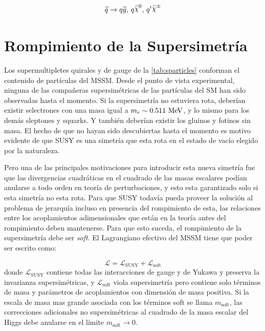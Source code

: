 \begin{equation}
  \susy{q} \to q\gluino, \, q\nino, \, q^\prime \chinopm
\end{equation}



\section{Rompimiento de la Supersimetría}

Los supermultipletes quirales y de gauge de la \cref{tab:sparticles} conforman
el contenido de partículas del MSSM. Desde el punto de vista experimental,
ninguna de las compa\~neras supersimétricas de las partículas del SM han sido
observadas hasta el momento. Si la supersimetría no estuviera rota, deberían
existir selectrones con una masa igual a $m_e \sim 0.511 \mev$, y lo mismo para
los demás sleptones y squarks. Y también deberían existir los gluinos y fotinos
sin masa. El hecho de que no hayan sido descubiertas hasta el momento es motivo
evidente de que SUSY es una simetría que esta rota en el estado de vacío elegido
por la naturaleza.

Pero una de las principales motivaciones para introducir esta nueva simetría fue
que las divergencias cuadráticas en el cuadrado de las masas escalares podían
anularse a todo orden en teoría de perturbaciones, y esto esta garantizado solo
si esta simetría no esta rota. Para que SUSY todavía pueda proveer la solución
al problema de jerarquía incluso en presencia del rompimiento de esta, las
relaciones entre los acoplamientos adimensionales que están en la teoría antes
del rompimiento deben mantenerse. Para que esto suceda, el rompimiento de la
supersimetría debe ser \emph{soft}. El Lagrangiano efectivo del MSSM tiene que
poder ser escrito como:

\begin{equation}
  \mathcal{L} = \mathcal{L}_\text{SUSY} + \mathcal{L}_\text{soft}
\end{equation}
%
donde $\mathcal{L}_\text{SUSY}$ contiene todas las interacciones de gauge y de
Yukawa y preserva la invarianza supersimétricas, y $\mathcal{L}_\text{soft}$
viola supersimetría pero contiene solo términos de masa y parámetros de
acoplamientos con dimensión de masa positiva. Si la escala de masa mas grande
asociada con los términos soft se llama $m_\text{soft}$, las correcciones
adicionales no supersimétricas al cuadrado de la masa escalar del Higgs debe
anularse en el límite $m_\text{soft} \to 0$.

